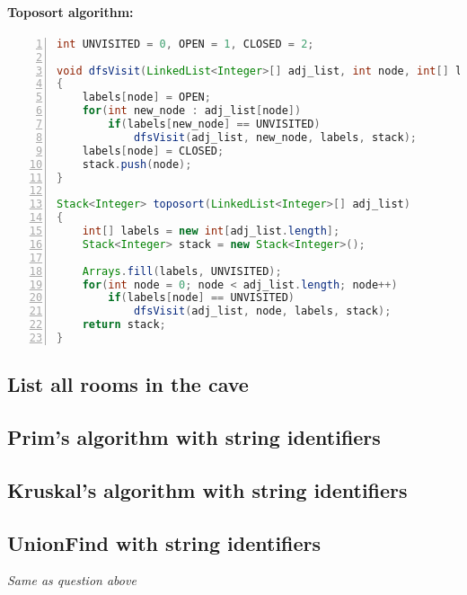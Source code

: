 \paragraph{Toposort algorithm:}
\begin{lstlisting}[label=code-toposort,caption=Toposort algorithm, language=Java, tabsize=2, breaklines=true, numbers=left]
int UNVISITED = 0, OPEN = 1, CLOSED = 2;

void dfsVisit(LinkedList<Integer>[] adj_list, int node, int[] labels, Stack<Integer> stack)
{
	labels[node] = OPEN;
	for(int new_node : adj_list[node])
		if(labels[new_node] == UNVISITED)
			dfsVisit(adj_list, new_node, labels, stack);
	labels[node] = CLOSED;
    stack.push(node);
}

Stack<Integer> toposort(LinkedList<Integer>[] adj_list)
{
	int[] labels = new int[adj_list.length];
    Stack<Integer> stack = new Stack<Integer>();
    
	Arrays.fill(labels, UNVISITED);
	for(int node = 0; node < adj_list.length; node++)
		if(labels[node] == UNVISITED)
			dfsVisit(adj_list, node, labels, stack);
    return stack;
}
\end{lstlisting}

\subsection{List all rooms in the cave}



\subsection{Prim's algorithm with string identifiers}


\subsection{Kruskal's algorithm with string identifiers}


\subsection{UnionFind with string identifiers}
\textit{Same as question above}


